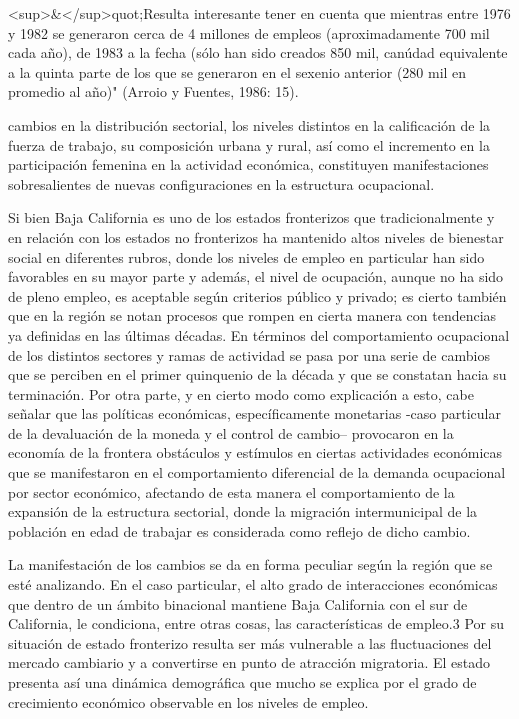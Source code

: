 \documentclass{article}
\begin{document}
<sup>\&</sup>quot;Resulta interesante tener en cuenta que mientras entre 1976 y 1982 se generaron cerca de 4 millones de empleos (aproximadamente 700 mil cada año), de 1983 a la fecha (sólo han sido creados 850 mil, canúdad equivalente a la quinta parte de los que se generaron en el sexenio anterior (280 mil en promedio al año)" (Arroio y Fuentes, 1986: 15).

cambios en la distribución sectorial, los niveles distintos en la calificación de la fuerza de trabajo, su composición urbana y rural, así como el incremento en la participación femenina en la actividad económica, constituyen manifestaciones sobresalientes de nuevas configuraciones en la estructura ocupacional.

Si bien Baja California es uno de los estados fronterizos que tradicionalmente y en relación con los estados no fronterizos ha mantenido altos niveles de bienestar social en diferentes rubros, donde los niveles de empleo en particular han sido favorables en su mayor parte y además, el nivel de ocupación, aunque no ha sido de pleno empleo, es aceptable según criterios público y privado; es cierto también que en la región se notan procesos que rompen en cierta manera con tendencias ya definidas en las últimas décadas. En términos del comportamiento ocupacional de los distintos sectores y ramas de actividad se pasa por una serie de cambios que se perciben en el primer quinquenio de la década y que se constatan hacia su terminación. Por otra parte, y en cierto modo como explicación a esto, cabe señalar que las políticas económicas, específicamente monetarias -caso particular de la devaluación de la moneda y el control de cambio-- provocaron en la economía de la frontera obstáculos y estímulos en ciertas actividades económicas que se manifestaron en el comportamiento diferencial de la demanda ocupacional por sector económico, afectando de esta manera el comportamiento de la expansión de la estructura sectorial, donde la migración intermunicipal de la población en edad de trabajar es considerada como reflejo de dicho cambio.

La manifestación de los cambios se da en forma peculiar según la región que se esté analizando. En el caso particular, el alto grado de interacciones económicas que dentro de un ámbito binacional mantiene Baja California con el sur de California, le condiciona, entre otras cosas, las características de empleo.3 Por su situación de estado fronterizo resulta ser más vulnerable a las fluctuaciones del mercado cambiario y a convertirse en punto de atracción migratoria. El estado presenta así una dinámica demográfica que mucho se explica por el grado de crecimiento económico observable en los niveles de empleo.
\end{document}
